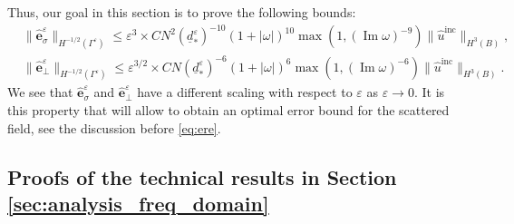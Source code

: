 \documentclass[]{article}
\numberwithin{equation}{section}
\numberwithin{theorem}{section}
\numberwithin{lemma}{section}
\numberwithin{corollary}{section}
\numberwithin{proposition}{section}
\numberwithin{definition}{section}
\newcommand{\re}{\varepsilon}
\renewcommand{\vec}{\boldsymbol}
\renewcommand{\Im}{\operatorname{Im}}
\newcommand{\inc}{\operatorname{inc}}
\begin{document}
	Thus, our goal in this section is to prove the following bounds:
	\begin{equation}
		\label{eq:bound_on_error_components_v1}
		\begin{aligned}
			&\| \hat{\vec{e}}^{\re}_{\sigma} \|_{H^{-1/2}(\Gamma^{\re})} \leq \re^{3}\times C N^2 (\underline{d}^{\re}_{*})^{-10} (1+|\omega|)^{10} \max(1, (\Im \omega)^{-9}) \|\hat{u}^{\inc}\|_{H^3(B)},\\
			&\| \hat{\vec{e}}^{\re}_{\perp} \|_{H^{-1/2}(\Gamma^{\re})} \leq \re^{3/2}\times C N (\underline{d}^{\re}_{*})^{-6} (1+|\omega|)^6 \max(1, (\Im \omega)^{-6})\|\hat{u}^{\inc}\|_{H^3(B)}.
		\end{aligned}
	\end{equation}
	We see that $\hat{\vec{e}}^{\re}_{\sigma}$ and $\hat{\vec{e}}_{\perp}^{\re}$ have a different scaling with respect to $\re$ as $\re\rightarrow 0$. It is this property that will allow to obtain an optimal error bound for the scattered field, see the discussion before \eqref{eq:ere}. 
	\subsection{Proofs of the technical results in Section \ref{sec:analysis_freq_domain}}	
\end{document}
